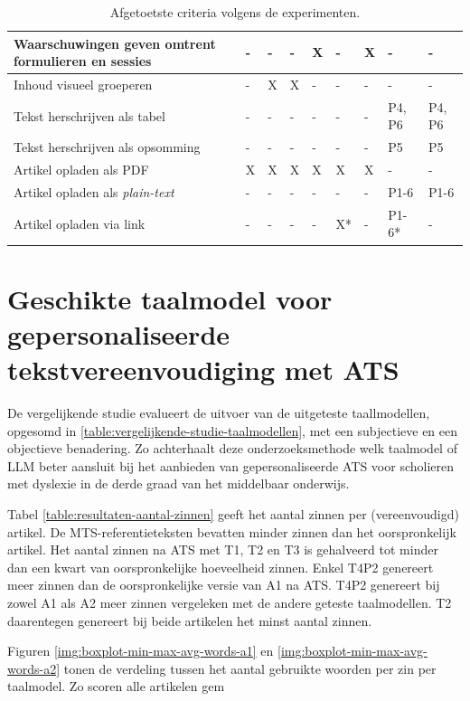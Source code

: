 \begin{table}[H]
\begin{tabular}{ | m{8cm} | m{0.5cm} | m{0.5cm} | m{0.5cm} | m{0.5cm} | m{0.5cm} | m{0.5cm} | m{1cm} | m{1cm} | }
		Waarschuwingen geven omtrent formulieren en sessies & - & - & - & X & - & X & - & - \\ \hline
		Inhoud visueel groeperen & - & X & X & - & - & - & - & - \\ \hline
		Tekst herschrijven als tabel & - & - & - & - & - & - & P4, P6 & P4, P6 \\ \hline
		Tekst herschrijven als opsomming & - & - & - & - & - & - & P5 & P5 \\ \hline
		Artikel opladen als PDF & X & X & X & X & X & X & - & - \\ \hline
		Artikel opladen als \textit{plain-text} & - & - & - & - & - & - & P1-6 & P1-6 \\ \hline
		Artikel opladen via link & - & - & - & - & X* & - & P1-6* & - \\ \hline
	\end{tabular}
	\caption{Afgetoetste criteria volgens de experimenten.}
	\label{table:afgetoetste-criteria}
\end{table}


\section{Geschikte taalmodel voor gepersonaliseerde tekstvereenvoudiging met ATS}

De vergelijkende studie evalueert de uitvoer van de uitgeteste taallmodellen, opgesomd in \ref{table:vergelijkende-studie-taalmodellen}, met een subjectieve en een objectieve benadering. Zo achterhaalt deze onderzoeksmethode welk taalmodel of LLM beter aansluit bij het aanbieden van gepersonaliseerde ATS voor scholieren met dyslexie in de derde graad van het middelbaar onderwijs. 

\medspace

Tabel \ref{table:resultaten-aantal-zinnen} geeft het aantal zinnen per (vereenvoudigd) artikel. De MTS-referentieteksten bevatten minder zinnen dan het oorspronkelijk artikel. Het aantal zinnen na ATS met T1, T2 en T3 is gehalveerd tot minder dan een kwart van oorspronkelijke hoeveelheid zinnen. Enkel T4P2 genereert meer zinnen dan de oorspronkelijke versie van A1 na ATS. T4P2 genereert bij zowel A1 als A2 meer zinnen vergeleken met de andere geteste taalmodellen. T2 daarentegen genereert bij beide artikelen het minst aantal zinnen.

\medspace

Figuren \ref{img:boxplot-min-max-avg-words-a1} en \ref{img:boxplot-min-max-avg-words-a2} tonen de verdeling tussen het aantal gebruikte woorden per zin per taalmodel. Zo scoren alle artikelen gem

